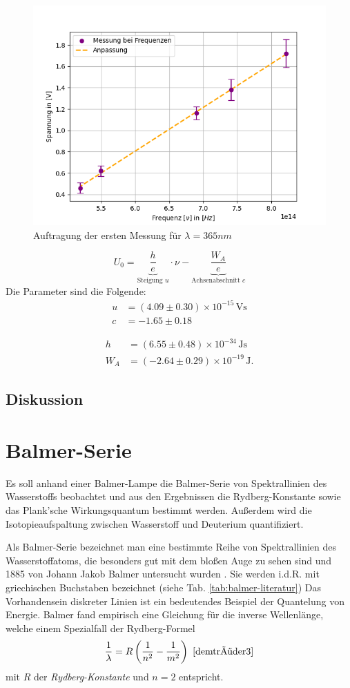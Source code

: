 \documentclass{article}
\begin{document}
\begin{figure}[h!]
  \centering
  \includegraphics[width=.5\linewidth]{402_wirkung}
  \caption{Auftragung der ersten Messung für $ \lambda =365nm$}
  \label{fig:wirkungs}
\end{figure}

\begin{equation}
  U_0 = \underbrace{\frac{h}{e}}_{\text{Steigung } u} \cdot \nu - \underbrace{\frac{W_A}{e}}_{\text{Achsenabschnitt } c}
\end{equation}
Die Parameter sind die Folgende:
\begin{align}
  u &= (4.09 \pm 0.30) \times 10^{-15} \, \mathrm{Vs}\\
  c &= -1.65 \pm 0.18
\end{align}
  

\begin{align}
  h &= (6.55 \pm 0.48) \times 10^{-34} \, \mathrm{Js}\\
  W_A &=(-2.64 \pm 0.29) \times 10^{-19} \, \mathrm{J}.
\end{align}

\clearpage
\subsection{Diskussion}

\section{Balmer-Serie}
Es soll anhand einer Balmer-Lampe die Balmer-Serie von Spektrallinien des Wasserstoffs beobachtet und aus den Ergebnissen
die Rydberg-Konstante sowie das Plank'sche Wirkungsquantum bestimmt werden. Außerdem wird die Isotopieaufspaltung zwischen Wasserstoff und Deuterium quantifiziert.

Als Balmer-Serie bezeichnet man eine bestimmte Reihe von Spektrallinien des Wasserstoffatoms, die besonders gut mit dem bloßen Auge zu sehen sind
und 1885 von Johann Jakob Balmer untersucht wurden \cite[S. 99]{demtröder3}. Sie werden i.d.R. mit griechischen Buchstaben bezeichnet (siehe Tab. \ref{tab:balmer-literatur})
Das Vorhandensein diskreter Linien ist ein bedeutendes Beispiel der Quantelung von Energie.
Balmer fand empirisch eine Gleichung für die inverse Wellenlänge, welche einem Spezialfall der Rydberg-Formel
\begin{equation}
  \frac{1}{\lambda} = R \left(\frac{1}{n^2} - \frac{1}{m^2}\right)\ \cite{demtröder3} \label{eq:rydberg-formel}
\end{equation}
mit $R$ der \textit{Rydberg-Konstante} und $n=2$ entspricht.
\end{document}
